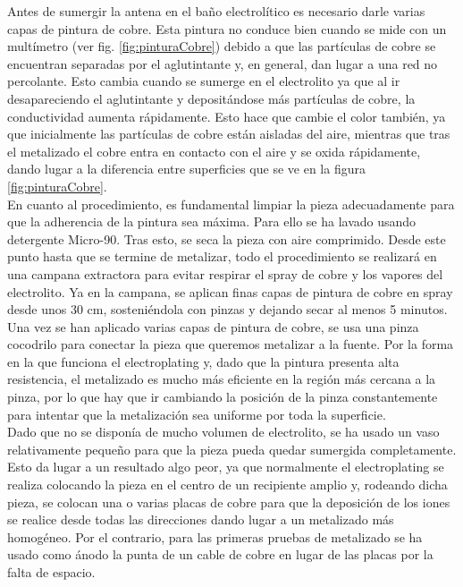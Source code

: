 \documentclass[11pt,a4paper,twoside,pdf]{article}
\numberwithin{equation}{section}
\begin{document}
Antes de sumergir la antena en el baño electrolítico es necesario darle varias capas de pintura de cobre. Esta pintura no conduce bien cuando se mide con un multímetro (ver fig. \ref{fig:pinturaCobre}) debido a que las partículas de cobre se encuentran separadas por el aglutintante y, en general, dan lugar a una red no percolante. Esto cambia cuando se sumerge en el electrolito ya que al ir desapareciendo el aglutintante y depositándose más partículas de cobre, la conductividad aumenta rápidamente. Esto hace que cambie el color también, ya que inicialmente las partículas de cobre están aisladas del aire, mientras que tras el metalizado el cobre entra en contacto con el aire y se oxida rápidamente, dando lugar a la diferencia entre superficies que se ve en la figura \ref{fig:pinturaCobre}.\\

En cuanto al procedimiento, es fundamental limpiar la pieza adecuadamente para que la adherencia de la pintura sea máxima. Para ello se ha lavado usando detergente Micro-90. Tras esto, se seca la pieza con aire comprimido. Desde este punto hasta que se termine de metalizar, todo el procedimiento se realizará en una campana extractora para evitar respirar el spray de cobre y los vapores del electrolito. Ya en la campana, se aplican finas capas de pintura de cobre en spray desde unos 30 cm, sosteniéndola con pinzas y dejando secar al menos 5 minutos.\\

Una vez se han aplicado varias capas de pintura de cobre, se usa una pinza cocodrilo para conectar la pieza que queremos metalizar a la fuente. Por la forma en la que funciona el electroplating y, dado que la pintura presenta alta resistencia, el metalizado es mucho más eficiente en la región más cercana a la pinza, por lo que hay que ir cambiando la posición de la pinza constantemente para intentar que la metalización sea uniforme por toda la superficie.\\

Dado que no se disponía de mucho volumen de electrolito, se ha usado un vaso relativamente pequeño para que la pieza pueda quedar sumergida completamente. Esto da lugar a un resultado algo peor, ya que normalmente el electroplating se realiza colocando la pieza en el centro de un recipiente amplio y, rodeando dicha pieza, se colocan una o varias placas de cobre para que la deposición de los iones se realice desde todas las direcciones dando lugar a un metalizado más homogéneo. Por el contrario, para las primeras pruebas de metalizado se ha usado como ánodo la punta de un cable de cobre en lugar de las placas por la falta de espacio.\\
\end{document}
